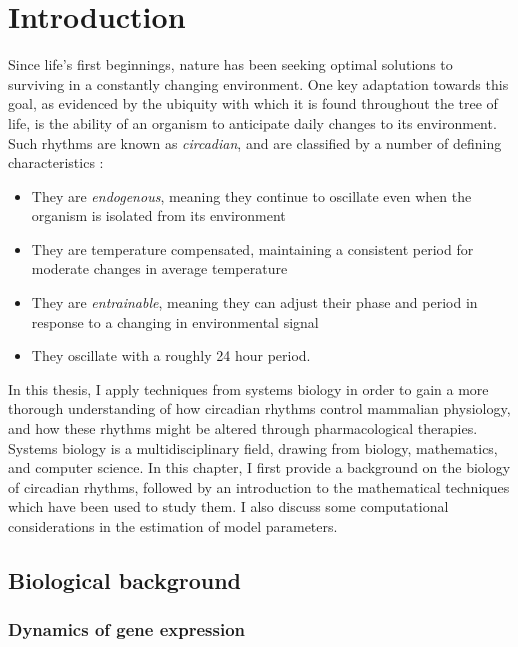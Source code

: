 \chapter{Introduction}
Since life's first beginnings, nature has been seeking optimal solutions to surviving in a constantly changing environment.
One key adaptation towards this goal, as evidenced by the ubiquity with which it is found throughout the tree of life, is the ability of an organism to anticipate daily changes to its environment.
Such rhythms are known as {\itshape circadian}, and are classified by a number of defining characteristics \cite{Dunlap2009}:

\begin{itemize}
  \item They are {\em endogenous}, meaning they continue to oscillate even when the organism is isolated from its environment

  \item They are temperature compensated, maintaining a consistent period for moderate changes in average temperature

  \item They are {\em entrainable}, meaning they can adjust their phase and period in response to a changing in environmental signal

  \item They oscillate with a roughly 24 hour period.
\end{itemize}

In this thesis, I apply techniques from systems biology in order to gain a more thorough understanding of how circadian rhythms control mammalian physiology, and how these rhythms might be altered through pharmacological therapies. %
Systems biology is a multidisciplinary field, drawing from biology, mathematics, and computer science. 
In this chapter, I first provide a background on the biology of circadian rhythms, followed by an introduction to the mathematical techniques which have been used to study them. 
I also discuss some computational considerations in the estimation of model parameters.

\section{Biological background}

\subsection{Dynamics of gene expression}

